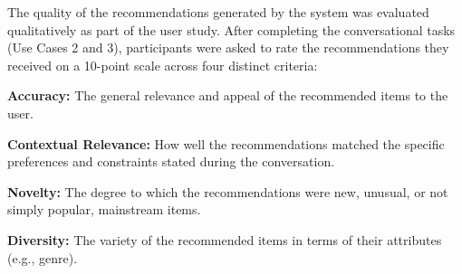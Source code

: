 The quality of the recommendations generated by the system was evaluated qualitatively as part of the user study. After completing the conversational tasks (Use Cases 2 and 3), participants were asked to rate the recommendations they received on a 10-point scale across four distinct criteria:

\begin{compactitem}[\textbullet]
    \item \textbf{Accuracy:} The general relevance and appeal of the recommended items to the user.
    \item \textbf{Contextual Relevance:} How well the recommendations matched the specific preferences and constraints stated during the conversation.
    \item \textbf{Novelty:} The degree to which the recommendations were new, unusual, or not simply popular, mainstream items.
    \item \textbf{Diversity:} The variety of the recommended items in terms of their attributes (e.g., genre).
\end{compactitem}